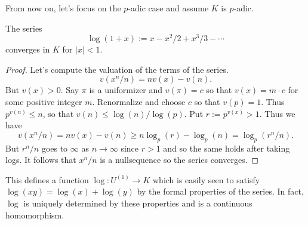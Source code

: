 From now on, let's focus on the $p$-adic case and assume $K$ is $p$-adic.
\begin{lemma}
  The series
  \[ \log(1+x) := x - x^{2}/2 + x^{3}/3 - \cdots \]
  converges in $K$ for $|x| < 1$.
\end{lemma}
\begin{proof}
  Let's compute the valuation of the terms of the series.
  \[ v(x^{n}/n) = n v(x) - v(n). \]
  But $v(x) > 0$.
  Say $\pi$ is a uniformizer and $v(\pi) = c$ so that $v(x) = m \cdot c$ for some positive integer $m$.
  Renormalize and choose $c$ so that $v(p) = 1$.
  Thus $p^{v(n)} \le n$, so that $v(n) \le \log(n)/\log(p)$.
  Put $r := p^{v(x)} > 1$.
  Thus we have
  \[ v(x^{n}/n) = n v(x) - v(n) \geq n \log_{p}(r) - \log_{p}(n) = \log_{p}(r^{n}/n). \]
  But $r^{n}/n$ goes to $\infty$ as $n \to \infty$ since $r > 1$ and so the same holds after taking logs.
  It follows that $x^{n}/n$ is a nullsequence so the series converges.
\end{proof}

This defines a function $\log : U^{(1)} \to K$ which is easily seen to satisfy $\log(x y) = \log(x) + \log(y)$ by the formal properties of the series.
In fact, $\log$ is uniquely determined by these properties and is a continuous homomorphism.

